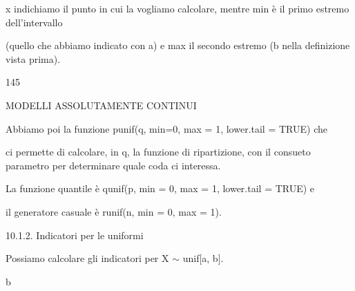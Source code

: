 \documentclass[a4paper,portrait,12pt]{article}
\begin{document}
\begin{flushleft}
x indichiamo il punto in cui la vogliamo calcolare, mentre min \`{e} il primo estremo dell'intervallo
\end{flushleft}


\begin{flushleft}
(quello che abbiamo indicato con a) e max il secondo estremo (b nella definizione vista prima).
\end{flushleft}


145










\begin{flushleft}
MODELLI ASSOLUTAMENTE CONTINUI
\end{flushleft}





\begin{flushleft}
Abbiamo poi la funzione punif(q, min=0, max = 1, lower.tail = TRUE) che
\end{flushleft}


\begin{flushleft}
ci permette di calcolare, in q, la funzione di ripartizione, con il consueto parametro per determinare quale coda ci interessa.
\end{flushleft}


\begin{flushleft}
La funzione quantile \`{e} qunif(p, min = 0, max = 1, lower.tail = TRUE) e
\end{flushleft}


\begin{flushleft}
il generatore casuale \`{e} runif(n, min = 0, max = 1).
\end{flushleft}





\begin{flushleft}
10.1.2. Indicatori per le uniformi
\end{flushleft}


\begin{flushleft}
Possiamo calcolare gli indicatori per X $\sim$ unif[a, b].
\end{flushleft}


\begin{flushleft}
b
\end{flushleft}
\end{document}
